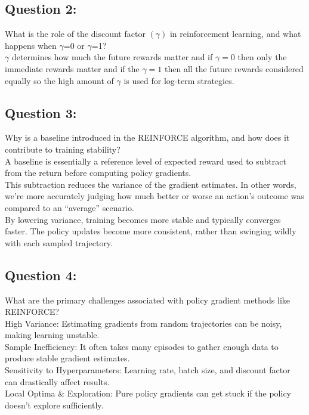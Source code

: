 \documentclass[12pt]{article}
\begin{document}
{{{				\subsection{Question 2:}
				
				What is the role of the discount factor $(\gamma)$ in reinforcement learning, and what happens when $\gamma$=0 or $\gamma$=1?\\
				$\gamma$ determines how much the future rewards matter and if $\gamma=0$ then only the immediate rewards matter and if the $\gamma=1$ then all the future rewards considered equally so the high amount of $\gamma$ is used for log-term strategies.
				\vspace*{0.3cm}
				
				\subsection{Question 3:}
				
				Why is a baseline introduced in the REINFORCE algorithm, and how does it contribute to training stability?\\
				A baseline is essentially a reference level of expected reward used to subtract from the return before computing policy gradients.\\
				This subtraction reduces the variance of the gradient estimates. In other words, we’re more accurately judging how much better or worse an action’s outcome was compared to an “average” scenario.\\
				By lowering variance, training becomes more stable and typically converges faster. The policy updates become more consistent, rather than swinging wildly with each sampled trajectory.
				\vspace*{0.3cm}
				
				\subsection{Question 4:}
				
				What are the primary challenges associated with policy gradient methods like REINFORCE?\\
				High Variance: Estimating gradients from random trajectories can be noisy, making learning unstable.\\
				Sample Inefficiency: It often takes many episodes to gather enough data to produce stable gradient estimates.\\
				Sensitivity to Hyperparameters: Learning rate, batch size, and discount factor can drastically affect results.\\
				Local Optima & Exploration: Pure policy gradients can get stuck if the policy doesn’t explore sufficiently.
				\vspace*{0.3cm}
				
}}}
\end{document}
